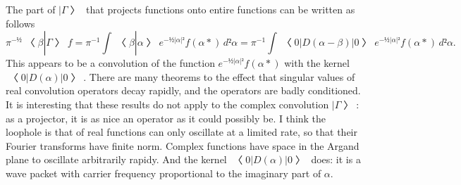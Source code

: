 
% 
% 
% 
% 
% 


The part of $|Γ〉$ that projects functions onto entire functions can be written as follows
$$π^{-½}〈β|Γ〉f=π^{-1}∫〈β|α〉e^{-½|α|²}f(α*)\,d²α=π^{-1}∫〈0|D(α-β)|0〉e^{-½|α|²}f(α*)\,d²α.$$
This appears to be a convolution of the function $e^{-½|α|²}f(α*)$ with the kernel $〈0|D(α)|0〉$.  There are many theorems to the effect that singular values of real convolution operators decay rapidly, and the operators are badly conditioned.  It is interesting that these results do not apply to the complex convolution $|Γ〉$: as a projector, it is as nice an operator as it could possibly be.  I think the loophole is that of real functions can only oscillate at a limited rate, so that their Fourier transforms have finite norm.  Complex functions have space in the Argand plane to oscillate arbitrarily rapidy.  And the kernel $〈0|D(α)|0〉$ does: it is a wave packet with carrier frequency proportional to the imaginary part of $α$.

